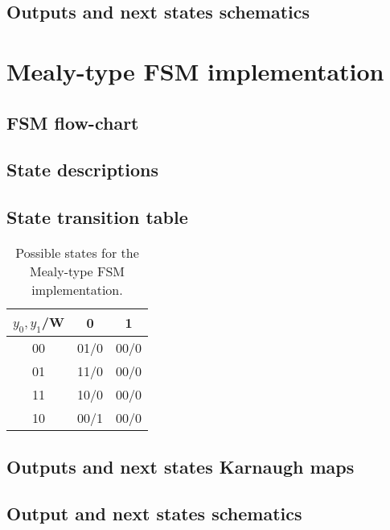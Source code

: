 \documentclass[../../e3_tp3_main.tex]{subfiles}
\begin{document}
\subsection{Outputs and next states schematics}


\section{Mealy-type FSM implementation}
\subsection{FSM flow-chart}


\subsection{State descriptions}


\subsection{State transition table}

\begin{table}[H]	%
	\centering
		\begin{tabular}{|c|c|c|}
		\hline 
		$y_0,y_1$/W & 0 & 1 \\ 
		\hline 
		00 & 01/0 & 00/0 \\ 
		\hline 
		01 & 11/0 & 00/0 \\ 
		\hline 
		11 & 10/0 & 00/0 \\ 
		\hline 
		10 & 00/1 & 00/0 \\ 
		\hline 
		\end{tabular} 
	\caption{Possible states for the Mealy-type FSM implementation.}
	\label{tab:ej3_moore_states}
\end{table}


\subsection{Outputs and next states Karnaugh maps}


\subsection{Output and next states schematics}
\end{document}
